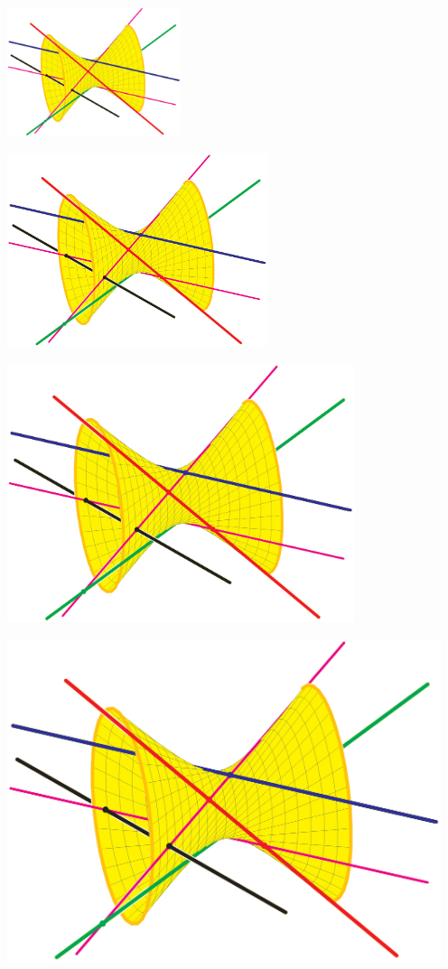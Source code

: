 \documentclass[12pt]{article}
\begin{document}
\includegraphics[width=2in]{4lines.eps}

\includegraphics[width=3in]{4lines.eps}

\includegraphics[width=4in]{4lines.eps}

\includegraphics[width=5in]{4lines.eps}
\end{document}
